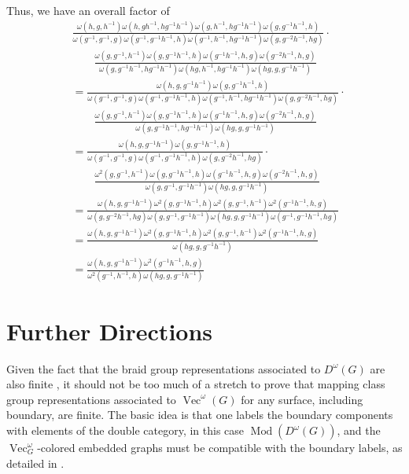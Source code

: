 \documentclass{amsart}
\DeclareMathOperator{\Mod}{Mod}
\DeclareMathOperator{\Vect}{Vec}
\begin{document}
 Thus, we have an overall factor of
{\allowdisplaybreaks
\begin{align*} 
&  \frac{\omega(h, g, h^{-1}) \omega(h, gh^{-1}, hg^{-1}h^{-1}) \omega(g, h^{-1}, hg^{-1}h^{-1}) \omega(g, g^{-1}h^{-1}, h) } 
{\omega(g^{-1}, g^{-1}, g) \omega(g^{-1}, g^{-1}h^{-1}, h) \omega(g^{-1}, h^{-1}, hg^{-1}h^{-1})  \omega(g, g^{-2}h^{-1}, hg)} \cdot \\ 
& \qquad  \frac{\omega(g, g^{-1}, h^{-1}) \omega(g, g^{-1}h^{-1}, h) \omega(g^{-1}h^{-1}, h, g) \omega(g^{-2}h^{-1}, h, g)}
{\omega(g, g^{-1}h^{-1}, hg^{-1}h^{-1}) \omega(hg, h^{-1}, hg^{-1}h^{-1}) \omega(hg, g, g^{-1}h^{-1})} \\
& = \frac{\omega(h, g, g^{-1}h^{-1})\omega(g, g^{-1}h^{-1}, h) } 
{\omega(g^{-1}, g^{-1}, g) \omega(g^{-1}, g^{-1}h^{-1}, h) \omega(g^{-1}, h^{-1}, hg^{-1}h^{-1})  \omega(g, g^{-2}h^{-1}, hg)} \cdot \\ 
& \qquad \frac{\omega(g, g^{-1}, h^{-1}) \omega(g, g^{-1}h^{-1}, h) \omega(g^{-1}h^{-1}, h, g) \omega(g^{-2}h^{-1}, h, g)}
{\omega(g, g^{-1}h^{-1}, hg^{-1}h^{-1}) \omega(hg, g, g^{-1}h^{-1}) } \\
& = \frac{\omega(h, g, g^{-1}h^{-1})\omega(g, g^{-1}h^{-1}, h) } 
{\omega(g^{-1}, g^{-1}, g) \omega(g^{-1}, g^{-1}h^{-1}, h)  \omega(g, g^{-2}h^{-1}, hg)} \cdot \\ 
& \qquad \frac{\omega^2(g, g^{-1}, h^{-1}) \omega(g, g^{-1}h^{-1}, h) \omega(g^{-1}h^{-1}, h, g) \omega(g^{-2}h^{-1}, h, g)}
{\omega(g, g^{-1}, g^{-1}h^{-1}) \omega(hg, g, g^{-1}h^{-1}) } \\
& = \frac{\omega(h, g, g^{-1}h^{-1})\omega^2(g, g^{-1}h^{-1}, h) \omega^2(g, g^{-1}, h^{-1})  \omega^2(g^{-1}h^{-1}, h, g)} 
{ \omega(g, g^{-2}h^{-1}, hg) \omega(g, g^{-1}, g^{-1}h^{-1}) \omega(hg, g, g^{-1}h^{-1}) \omega(g^{-1}, g^{-1}h^{-1}, hg)} \\
& = \frac{\omega(h, g, g^{-1}h^{-1})\omega^2(g, g^{-1}h^{-1}, h) \omega^2(g, g^{-1}, h^{-1}) \omega^2(g^{-1}h^{-1}, h, g) } 
{  \omega(hg, g, g^{-1}h^{-1}) } \\
& = \frac{\omega(h, g, g^{-1}h^{-1})  \omega^2(g^{-1}h^{-1}, h, g) } 
{\omega^2(g^{-1}, h^{-1},h)  \omega(hg, g, g^{-1}h^{-1}) } 
\end{align*}
}


\section{Further Directions}
Given the fact that the braid group representations associated to $D^\omega(G)$ are also finite \cite{erw}, it should not be too much of a
stretch to prove that mapping class group representations associated to $\Vect^\omega(G)$ for any surface, including boundary, are finite.  
The basic idea is that one labels the boundary components with elements of the double category, in this case $\Mod(D^\omega(G))$, and the
$\Vect_G^\omega$-colored embedded graphs must be compatible with the boundary labels, as detailed in \cite{kirillovStringNets}.  
\end{document}

